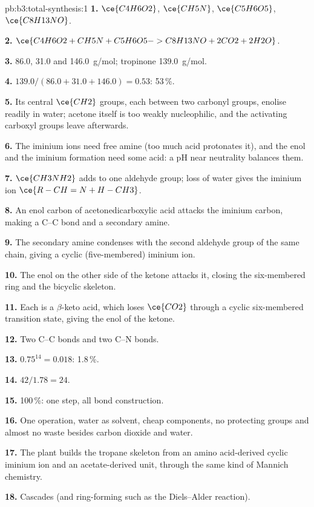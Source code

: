 \begin{solution}{pb:b3:total-synthesis:1}
\textbf{1.} $\ce{C4H6O2}$, $\ce{CH5N}$, $\ce{C5H6O5}$, $\ce{C8H13NO}$.

\textbf{2.} $\ce{C4H6O2 + CH5N + C5H6O5 -> C8H13NO + 2CO2 + 2H2O}$.

\textbf{3.} 86.0, 31.0 and \qty{146.0}{g/mol}; tropinone \qty{139.0}{g/mol}.

\textbf{4.} $139.0/(86.0 + 31.0 + 146.0) = 0.53$: 53\,\%.

\textbf{5.} Its central $\ce{CH2}$ groups, each between two carbonyl groups, enolise readily in
water; acetone itself is too weakly nucleophilic, and the activating carboxyl
groups leave afterwards.

\textbf{6.} The iminium ions need free amine (too much acid protonates it), and the
enol and the iminium formation need some acid: a pH near neutrality balances them.

\textbf{7.} $\ce{CH3NH2}$ adds to one aldehyde group; loss of water gives the iminium ion
$\ce{R-CH=N+H-CH3}$.

\textbf{8.} An enol carbon of acetonedicarboxylic acid attacks the iminium carbon, making a
C--C bond and a secondary amine.

\textbf{9.} The secondary amine condenses with the second aldehyde group of the same
chain, giving a cyclic (five-membered) iminium ion.

\textbf{10.} The enol on the other side of the ketone attacks it, closing the
six-membered ring and the bicyclic skeleton.

\textbf{11.} Each is a $\beta$-keto acid, which loses $\ce{CO2}$ through a cyclic six-membered transition
state, giving the enol of the ketone.

\textbf{12.} Two C--C bonds and two C--N bonds.

\textbf{13.} $0.75^{14} = 0.018$: 1.8\,\%.

\textbf{14.} $42/1.78 = 24$.

\textbf{15.} 100\,\%: one step, all bond construction.

\textbf{16.} One operation, water as solvent, cheap components, no protecting groups and
almost no waste besides carbon dioxide and water.

\textbf{17.} The plant builds the tropane skeleton from an amino acid-derived
cyclic iminium ion and an acetate-derived unit, through the same kind of Mannich
chemistry.

\textbf{18.} Cascades (and ring-forming  such as the Diels--Alder
reaction).


\end{solution}
